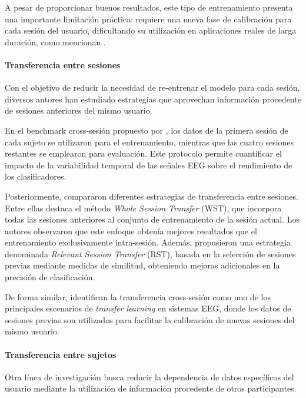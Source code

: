 A pesar de proporcionar buenos resultados, este tipo de entrenamiento presenta una importante limitación práctica: requiere una nueva fase de calibración para cada sesión del usuario, dificultando su utilización en aplicaciones reales de larga duración, como mencionan \textcite{sung_ImprovingIntersession2024}.

\paragraph*{Transferencia entre sesiones}

Con el objetivo de reducir la necesidad de re-entrenar el modelo para cada sesión, diversos autores han estudiado estrategias que aprovechan información procedente de sesiones anteriores del mismo usuario.

En el benchmark cross-sesión propuesto por \textcite{ma_LargeEEG2022}, los datos de la primera sesión de cada sujeto se utilizaron para el entrenamiento, mientras que las cuatro sesiones restantes se emplearon para evaluación. Este protocolo permite cuantificar el impacto de la variabilidad temporal de las señales EEG sobre el rendimiento de los clasificadores.

Posteriormente, \textcite{sung_ImprovingIntersession2024} compararon diferentes estrategias de transferencia entre sesiones. Entre ellas destaca el método \textit{Whole Session Transfer} (WST), que incorpora todas las sesiones anteriores al conjunto de entrenamiento de la sesión actual. Los autores observaron que este enfoque obtenía mejores resultados que el entrenamiento exclusivamente intra-sesión. Además, propusieron una estrategia denominada \textit{Relevant Session Transfer} (RST), basada en la selección de sesiones previas mediante medidas de similitud, obteniendo mejoras adicionales en la precisión de clasificación.

De forma similar, \textcite{wu_TransferLearning2020} identifican la transferencia cross-sesión como uno de los principales escenarios de \textit{transfer learning} en sistemas EEG, donde los datos de sesiones previas son utilizados para facilitar la calibración de nuevas sesiones del mismo usuario.

\paragraph*{Transferencia entre sujetos}

Otra línea de investigación busca reducir la dependencia de datos específicos del usuario mediante la utilización de información procedente de otros participantes.

